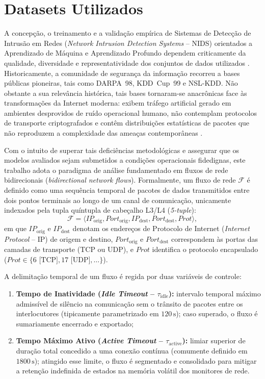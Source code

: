 \section{Datasets Utilizados}
\label{sec:datasets_utilizados}

A concepção, o treinamento e a validação empírica de Sistemas de Detecção de Intrusão em Redes (\emph{Network Intrusion Detection Systems} -- NIDS) orientados a Aprendizado de Máquina e Aprendizado Profundo dependem criticamente da qualidade, diversidade e representatividade dos conjuntos de dados utilizados \cite{standard2021, netflow2020}. Historicamente, a comunidade de segurança da informação recorreu a bases públicas pioneiras, tais como DARPA~98, KDD~Cup~99 e NSL-KDD. Não obstante a sua relevância histórica, tais bases tornaram-se anacrônicas face às transformações da Internet moderna: exibem tráfego artificial gerado em ambientes desprovidos de ruído operacional humano, não contemplam protocolos de transporte criptografados e contêm distribuições estatísticas de pacotes que não reproduzem a complexidade das ameaças contemporâneas \cite{Sharafaldin2018TowardGA, advancedids2024}.

Com o intuito de superar tais deficiências metodológicas e assegurar que os modelos avaliados sejam submetidos a condições operacionais fidedignas, este trabalho adota o paradigma de análise fundamentado em fluxos de rede bidirecionais (\emph{bidirectional network flows}). Formalmente, um fluxo de rede $\mathcal{F}$ é definido como uma sequência temporal de pacotes de dados transmitidos entre dois pontos terminais ao longo de um canal de comunicação, unicamente indexados pela tupla quíntupla de cabeçalho L3/L4 (\emph{5-tuple}):
\begin{equation}
\label{eq:fluxo_definicao}
\mathcal{F} = \langle IP_{\mathrm{orig}}, Port_{\mathrm{orig}}, IP_{\mathrm{dest}}, Port_{\mathrm{dest}}, Prot \rangle,
\end{equation}
em que $IP_{\mathrm{orig}}$ e $IP_{\mathrm{dest}}$ denotam os endereços de Protocolo de Internet (\emph{Internet Protocol} -- IP) de origem e destino, $Port_{\mathrm{orig}}$ e $Port_{\mathrm{dest}}$ correspondem às portas das camadas de transporte (TCP ou UDP), e $Prot$ identifica o protocolo encapsulado ($Prot \in \{6 \text{ [TCP]}, 17 \text{ [UDP]}, \dots\}$).

A delimitação temporal de um fluxo é regida por duas variáveis de controle:
\begin{enumerate}
    \item \textbf{Tempo de Inatividade (\emph{Idle Timeout} -- $\tau_{\mathrm{idle}}$):} intervalo temporal máximo admissível de silêncio na comunicação sem o trânsito de pacotes entre os interlocutores (tipicamente parametrizado em $120\,\mathrm{s}$); caso superado, o fluxo é sumariamente encerrado e exportado;
    \item \textbf{Tempo Máximo Ativo (\emph{Active Timeout} -- $\tau_{\mathrm{active}}$):} limiar superior de duração total concedido a uma conexão contínua (comumente definido em $1800\,\mathrm{s}$); atingido esse limite, o fluxo é segmentado e consolidado para mitigar a retenção indefinida de estados na memória volátil dos monitores de rede.
\end{enumerate}

